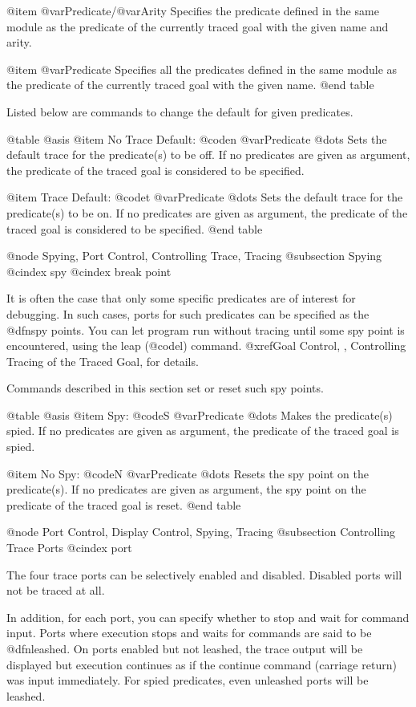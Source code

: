 {{{{@item @var{Predicate}/@var{Arity}
Specifies the predicate defined in the same module as the predicate of
the currently traced goal with the given name and arity.

@item @var{Predicate}
Specifies all the predicates defined in the same module as the predicate
of the currently traced goal with the given name.
@end table

Listed below are commands to change the default for given predicates.

@table @asis
@item No Trace Default: @code{n} @var{Predicate} @dots{}
Sets the default trace for the predicate(s) to be off.  If no predicates
are given as argument, the predicate of the traced goal is considered to
be specified.

@item Trace Default: @code{t} @var{Predicate} @dots{}
Sets the default trace for the predicate(s) to be on.  If no predicates
are given as argument, the predicate of the traced goal is considered to
be specified.
@end table

@node Spying, Port Control, Controlling Trace, Tracing
@subsection Spying
@cindex spy
@cindex break point

It is often the case that only some specific predicates are of interest
for debugging.  In such cases, ports for such predicates can be
specified as the @dfn{spy points}.  You can let program run without
tracing until some spy point is encountered, using the leap (@code{l})
command.  @xref{Goal Control, , Controlling Tracing of the Traced Goal},
for details.

Commands described in this section set or reset such spy points.

@table @asis
@item Spy: @code{S} @var{Predicate} @dots{}
Makes the predicate(s) spied.  If no predicates are given as argument,
the predicate of the traced goal is spied.

@item No Spy: @code{N} @var{Predicate} @dots{}
Resets the spy point on the predicate(s).  If no predicates are given as
argument, the spy point on the predicate of the traced goal is reset.
@end table

@node Port Control, Display Control, Spying, Tracing
@subsection Controlling Trace Ports
@cindex port

The four trace ports can be selectively enabled and disabled.  Disabled
ports will not be traced at all.

In addition, for each port, you can specify whether to stop and wait for
command input.  Ports where execution stops and waits for commands are
said to be @dfn{leashed}.  On ports enabled but not leashed, the trace
output will be displayed but execution continues as if the continue
command (carriage return) was input immediately.  For spied predicates,
even unleashed ports will be leashed.

}}}}
